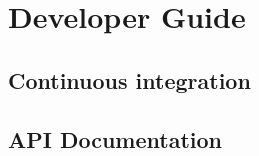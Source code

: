 \section{Developer Guide}\label{Developer Guide}

\subsection{Continuous integration}\label{Continuous integration}
\subsection{API Documentation}\label{API Documentation}
